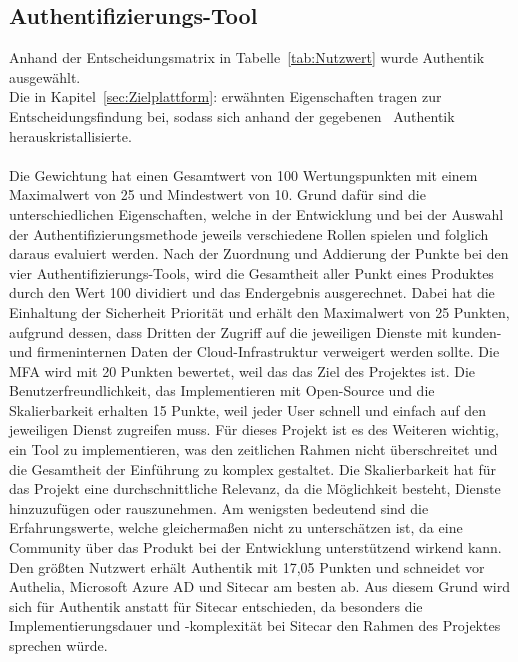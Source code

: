\subsection{Authentifizierungs-Tool}
\label{sec:Authentifizierungs-Tool}
Anhand der Entscheidungsmatrix in Tabelle~\ref{tab:Nutzwert} wurde Authentik ausgewählt. 
\\Die in Kapitel~\ref{sec:Zielplattform}:  erwähnten Eigenschaften tragen zur Entscheidungsfindung bei, sodass 
sich anhand der gegebenen~ Authentik herauskristallisierte.
\\
\\Die Gewichtung hat einen Gesamtwert von 100 Wertungspunkten mit einem Maximalwert von 25 und Mindestwert von 10. Grund dafür sind die 
unterschiedlichen Eigenschaften, welche in der Entwicklung und bei der Auswahl der Authentifizierungsmethode jeweils verschiedene Rollen 
spielen und folglich daraus evaluiert werden. Nach der Zuordnung und Addierung der Punkte bei den vier Authentifizierungs-Tools, 
wird die Gesamtheit aller Punkt eines Produktes durch den Wert 100 dividiert und das Endergebnis ausgerechnet. 
Dabei hat die Einhaltung der Sicherheit Priorität und erhält den Maximalwert von 25 Punkten, aufgrund dessen, dass Dritten der Zugriff 
auf die jeweiligen Dienste mit kunden- und firmeninternen Daten der Cloud-Infrastruktur verweigert werden sollte. 
Die \acs*{MFA} wird mit 20 Punkten bewertet, weil das das Ziel des Projektes ist. Die Benutzerfreundlichkeit, das Implementieren mit 
Open-Source und die Skalierbarkeit erhalten 15 Punkte, weil jeder User schnell und einfach auf den jeweiligen Dienst zugreifen muss. 
Für dieses Projekt ist es des Weiteren wichtig, ein Tool zu implementieren, was den zeitlichen Rahmen nicht überschreitet und die 
Gesamtheit der Einführung zu komplex gestaltet. Die Skalierbarkeit hat für das Projekt eine durchschnittliche Relevanz, da die 
Möglichkeit besteht, Dienste hinzuzufügen oder rauszunehmen. Am wenigsten bedeutend sind die Erfahrungswerte, welche 
gleichermaßen nicht zu unterschätzen ist, da eine Community über das Produkt bei der Entwicklung unterstützend wirkend kann.
\\Den größten Nutzwert erhält Authentik mit 17,05 Punkten und schneidet vor Authelia, Microsoft Azure AD und Sitecar am besten ab. 
Aus diesem Grund wird sich für Authentik anstatt für Sitecar entschieden, da besonders die Implementierungsdauer und -komplexität 
bei Sitecar den Rahmen des Projektes sprechen würde.

